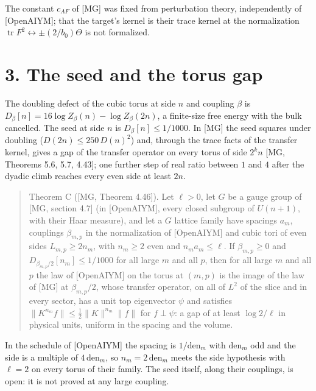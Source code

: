 \documentclass[10pt,letterpaper,twocolumn]{article}
\providecommand{\rm}{}\DeclareOldFontCommand{\rm}{\normalfont\rmfamily}{\mathrm}
\begin{document}
The constant \(c_{\rm AF}\) of {[}MG{]} was fixed from perturbation theory, independently of {[}OpenAIYM{]}; that the target's kernel is their trace kernel at the normalization \(\operatorname{tr}F^2\leftrightarrow\pm(2/b_0)\Theta\) is not formalized.

\section{3. The seed and the torus gap}\label{3-the-seed-and-the-torus-gap}

The doubling defect of the cubic torus at side \(n\) and coupling \(\beta\) is \(D_\beta[n]=16\log Z_\beta(n)-\log Z_\beta(2n)\), a finite-size free energy with the bulk cancelled. The seed at side \(n\) is \(D_\beta[n]\le1/1000\). In {[}MG{]} the seed squares under doubling (\(D(2n)\le250\,D(n)^2\)) and, through the trace facts of the transfer kernel, gives a gap of the transfer operator on every torus of side \(2^kn\) {[}MG, Theorems 5.6, 5.7, 4.43{]}; one further step of real ratio between \(1\) and \(4\) after the dyadic climb reaches every even side at least \(2n\).

\begin{quote}
Theorem C ({[}MG, Theorem 4.46{]}). Let \(\ell>0\), let \(G\) be a gauge group of {[}MG, section 4.7{]} (in {[}OpenAIYM{]}, every closed subgroup of \(U(n+1)\), with their Haar measure), and let a \(G\) lattice family have spacings \(a_m\), couplings \(\beta_{m,p}\) in the normalization of {[}OpenAIYM{]} and cubic tori of even sides \(L_{m,p}\ge2n_m\), with \(n_m\ge2\) even and \(n_ma_m\le\ell\). If \(\beta_{m,p}\ge0\) and \(D_{\beta_{m,p}/2}[n_m]\le1/1000\) for all large \(m\) and all \(p\), then for all large \(m\) and all \(p\) the law of {[}OpenAIYM{]} on the torus at \((m,p)\) is the image of the law of {[}MG{]} at \(\beta_{m,p}/2\), whose transfer operator, on all of \(L^2\) of the slice and in every sector, has a unit top eigenvector \(\psi\) and satisfies \(\|K^{n_m}f\|\le\tfrac12\|K\|^{n_m}\|f\|\) for \(f\perp\psi\): a gap of at least \(\log2/\ell\) in physical units, uniform in the spacing and the volume.
\end{quote}

In the schedule of {[}OpenAIYM{]} the spacing is \(1/\mathrm{den}_m\) with \(\mathrm{den}_m\) odd and the side is a multiple of \(4\,\mathrm{den}_m\), so \(n_m=2\,\mathrm{den}_m\) meets the side hypothesis with \(\ell=2\) on every torus of their family. The seed itself, along their couplings, is open: it is not proved at any large coupling.
\end{document}

